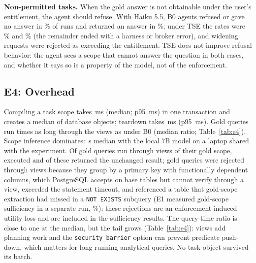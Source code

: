 



\textbf{Non-permitted tasks.} When the gold answer is not obtainable under the user's entitlement, the agent should
refuse. With Haiku 5.5, B0 agents refused or gave no answer in \npRefuseBzero\% of runs and returned an answer in
\npSilentBzero\%; under TSE the rates were \npRefuseTse\% and \npSilentTse\% (the remainder ended with a harness or broker error),
and \npExceedReq{} widening requests were rejected as exceeding the entitlement. TSE does not improve refusal
behavior: the agent sees a scope that cannot answer the question in both cases, and whether it says so is a property
of the model, not of the enforcement.

\subsection{E4: Overhead}
\label{sec:res-overhead}
Compiling a task scope takes \medCompile{}\,ms (median; p95 \pNinetyFiveCompile{}\,ms) in one transaction and creates a
median of \medObjects{} database objects; teardown takes \medTeardown{}\,ms (p95 \pNinetyFiveTeardown{}\,ms). Gold
queries run \medQueryRatio{} times as long through the views as under B0 (median ratio; Table~\ref{tab:e4}). Scope
inference dominates: \medInferS{}\,s median with the local 7B model on a laptop shared with the experiment. Of \eFourTotal{} gold
queries run through views of their gold scope, \eFourOk{} executed and \eFourEqual{} of these returned the unchanged
result; \eFourGroupingErr{} gold queries were
rejected through views because they group by a primary key with functionally dependent columns, which PostgreSQL
accepts on base tables but cannot verify through a view, \eFourTimeout{} exceeded the statement timeout, and \eFourOther{} referenced a table that gold-scope extraction had
missed in a \texttt{NOT EXISTS} subquery (E1 measured gold-scope sufficiency in a separate run, \goldSufficient\%); these rejections are an enforcement-induced utility loss and are
included in the sufficiency results. The query-time ratio is close to one at the median, but the tail grows
(Table~\ref{tab:e4}): views add planning work and the \texttt{security\_barrier} option can prevent predicate
push-down, which matters for long-running analytical queries. No task object survived its batch.



